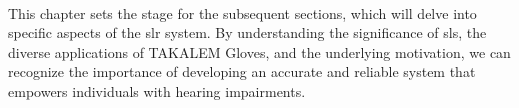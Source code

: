 \paragraph{}
This chapter sets the stage for the subsequent sections, which will delve into specific aspects of the \ac{slr} system. By understanding the significance of \ac{sl}s, the diverse applications of TAKALEM Gloves, and the underlying motivation, we can recognize the importance of developing an accurate and reliable system that empowers individuals with hearing impairments.